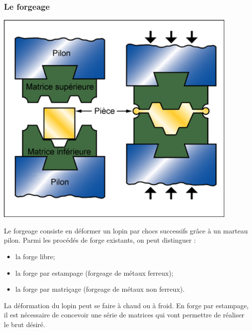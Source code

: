 \documentclass[11pt,oneside]{article}
\begin{document}
\subsubsection{Le forgeage}
\begin{minipage}[c]{.3\linewidth}
\begin{center}
\includegraphics[width=0.9\textwidth]{png/forge_schema}
\end{center}
\end{minipage}\hfill
\begin{minipage}[c]{.65\linewidth}
Le forgeage consiste en déformer un lopin par chocs successifs grâce à un marteau pilon. Parmi les procédés de forge existants, on peut distinguer : 
\begin{itemize}
\item la forge libre;
\item la forge par estampage (forgeage de métaux ferreux);
\item la forge par matriçage (forgeage de métaux non ferreux).
\end{itemize}

La déformation du lopin peut se faire à chaud ou à froid. En forge par estampage, il est nécessaire de concevoir une série de matrices qui vont permettre de réaliser le brut désiré. 
\end{minipage}
\end{document}
